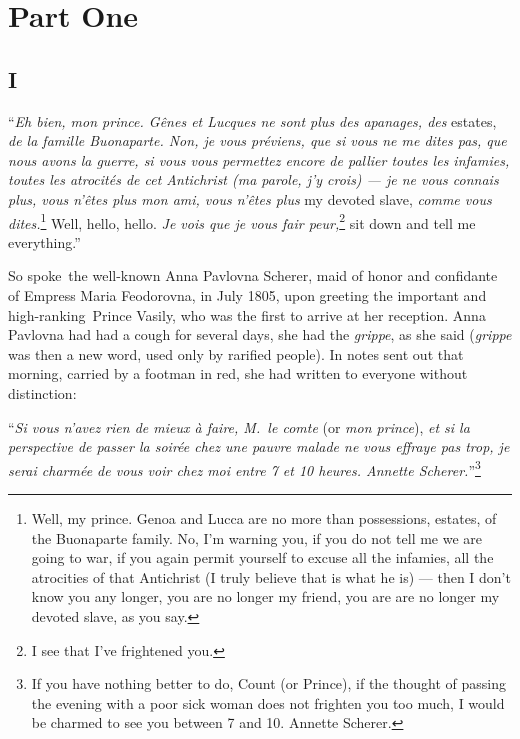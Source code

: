 \chapter{Part One}

\section{I} %

``\textit{Eh bien, mon prince. G\^enes et Lucques ne sont plus des
  apanages, des} estates, \textit{de la famille Buonaparte. Non, je
  vous pr\'eviens, que si vous ne me dites pas, que nous avons la
  guerre, si vous vous permettez encore de pallier toutes les
  infamies, toutes les atrocit\'es de cet Antichrist (ma parole, j'y
  crois) --- je ne vous connais plus, vous n'\^etes plus mon ami, vous
  n'\^etes plus} my devoted slave, \textit{comme vous
  dites.}\footnote{Well, my prince. Genoa and Lucca are no more than
  possessions, estates, of the Buonaparte family. No, I'm warning you,
  if you do not tell me we are going to war, if you again permit
  yourself to excuse all the infamies, all the atrocities of that
  Antichrist (I truly believe that is what he is) --- then I don't
  know you any longer, you are no longer my friend, you are are no
  longer my devoted slave, as you say.} Well, hello, hello. \textit{Je
  vois que je vous fair peur,}\footnote{I see that I've frightened
  you.} sit down and tell me everything.''

So spoke\ the well-known Anna Pavlovna
Scherer, maid of honor and confidante of Empress Maria Feodorovna, in
July 1805, upon greeting the important and
high-ranking\ Prince Vasily, who was the first to
arrive at her reception. Anna Pavlovna had had a cough for several
days, she had the \textit{grippe}, as she said (\textit{grippe} was
then a new word, used only by rarified people). In notes sent out that
morning, carried by a footman in red, she had written to everyone
without distinction:

``\textit{Si vous n'avez rien de mieux \`a faire, M.~le comte} (or
\textit{mon prince}), \textit{et si la perspective de passer la
  soir\'ee chez une pauvre malade ne vous effraye pas trop, je serai
  charm\'ee de vous voir chez moi entre 7 et 10 heures. Annette
  Scherer.}''\footnote{If you have nothing better to do, Count (or
  Prince), if the thought of passing the evening with a poor sick
  woman does not frighten you too much, I would be charmed to see you
  between 7 and 10. Annette Scherer.}

